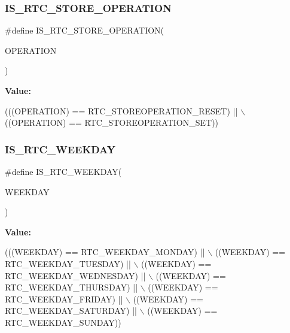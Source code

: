 \subsubsection{\texorpdfstring{I\+S\+\_\+\+R\+T\+C\+\_\+\+S\+T\+O\+R\+E\+\_\+\+O\+P\+E\+R\+A\+T\+I\+ON}{IS\_RTC\_STORE\_OPERATION}}
{\footnotesize\ttfamily \#define I\+S\+\_\+\+R\+T\+C\+\_\+\+S\+T\+O\+R\+E\+\_\+\+O\+P\+E\+R\+A\+T\+I\+ON(\begin{DoxyParamCaption}\item[{}]{O\+P\+E\+R\+A\+T\+I\+ON }\end{DoxyParamCaption})}

{\bfseries Value\+:}
\begin{DoxyCode}
(((OPERATION) == RTC\_STOREOPERATION\_RESET) || \(\backslash\)
                                           ((OPERATION) == RTC\_STOREOPERATION\_SET))
\end{DoxyCode}
\mbox{\label{group___r_t_c___i_s___r_t_c___definitions_gaf17712ffb0834287f23c19235d53c7ec}} 
\subsubsection{\texorpdfstring{I\+S\+\_\+\+R\+T\+C\+\_\+\+W\+E\+E\+K\+D\+AY}{IS\_RTC\_WEEKDAY}}
{\footnotesize\ttfamily \#define I\+S\+\_\+\+R\+T\+C\+\_\+\+W\+E\+E\+K\+D\+AY(\begin{DoxyParamCaption}\item[{}]{W\+E\+E\+K\+D\+AY }\end{DoxyParamCaption})}

{\bfseries Value\+:}
\begin{DoxyCode}
(((WEEKDAY) == RTC\_WEEKDAY\_MONDAY)    || \(\backslash\)
                                 ((WEEKDAY) == RTC\_WEEKDAY\_TUESDAY)   || \(\backslash\)
                                 ((WEEKDAY) == RTC\_WEEKDAY\_WEDNESDAY) || \(\backslash\)
                                 ((WEEKDAY) == RTC\_WEEKDAY\_THURSDAY)  || \(\backslash\)
                                 ((WEEKDAY) == RTC\_WEEKDAY\_FRIDAY)    || \(\backslash\)
                                 ((WEEKDAY) == RTC\_WEEKDAY\_SATURDAY)  || \(\backslash\)
                                 ((WEEKDAY) == RTC\_WEEKDAY\_SUNDAY))
\end{DoxyCode}

